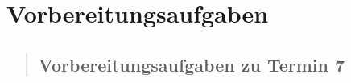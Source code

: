 \section{Vorbereitungsaufgaben}
\begin{quote}
    
    \subsection{Vorbereitungsaufgaben zu Termin 7}
    \begin{quote}
 
	
	\end{quote}%
	
	
 
\end{quote}%

% 		
% 			
% 		
% 		
% 		


